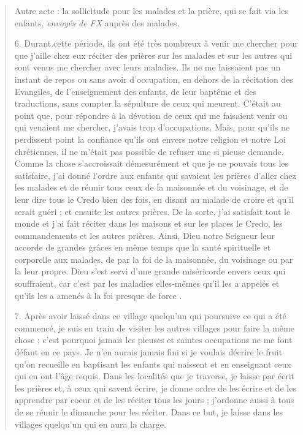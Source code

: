 \begin{quote}
\begin{Synthesis}
Autre acte : la sollicitude pour les malades et la prière, qui se fait via les enfants, \textit{envoyés de FX} auprès des malades. 
\end{Synthesis}
6. Durant.cette période, ils ont été très nombreux à venir me
chercher pour que j'aille chez eux réciter des prières sur les malades
et sur les autres qui sont venus me chercher avec leurs maladies.
Ils ne me laissaient pas un instant de repos ou sans avoir
d'occupation, en dehors de la récitation des Evangiles, de l'enseignement
des enfants, de leur baptême et des traductions, sans
compter la sépulture de ceux qui meurent. C'était au point que,
pour répondre à la dévotion de ceux qui me faisaient venir ou qui
venaient me chercher, j'avais trop d'occupations. Mais, pour qu'ils
ne perdissent point la confiance qu'ils ont envers notre religion et
notre Loi chrétiennes, il ne m'était pas possible de refuser une si
 pieuse demande. Comme la chose s'accroissait démesurément et
que je ne pouvais tous les satisfaire, j'ai donné l'ordre aux enfants
qui savaient les prières d'aller chez les malades et de réunir tous
ceux de la maisonnée et du voisinage, et de leur dire tous le Credo
bien des fois, en disant au malade de croire et qu'il serait guéri ;
et ensuite les autres prières. De la sorte, j'ai satisfait tout le monde
et j'ai fait réciter dans les maisons et sur les places le Credo, les
commandements et les autres prières. Ainsi, Dieu notre Seigneur
leur accorde de grandes grâces en même temps que la santé spirituelle
et corporelle aux malades, de par la foi de la maisonnée, du
voisinage ou par la leur propre. Dieu s'est servi d'une grande miséricorde
envers ceux qui souffraient, car c'est par les maladies elles-mêmes
qu'il les a appelés et qu'ils les a amenés à la foi presque de
force .


7. Après avoir laissé dans ce village quelqu'un qui poursuive ce
qui a été commencé, je suis en train de visiter les autres villages
pour faire la même chose ; c'est pourquoi jamais les pieuses et saintes
occupations ne me font défaut en ce pays. Je n'en aurais jamais
fini si je voulais décrire le fruit qu'on recueille en baptisant les
enfants qui naissent et en enseignant ceux qui en ont l'âge requis.
Dans les localités que je traverse, je laisse par écrit les prières et,
à ceux qui savent écrire, je donne ordre de les écrire et de les
apprendre par coeur et de les réciter tous les jours ; j'ordonne aussi
à tous de se réunir le dimanche pour les réciter. Dans ce but, je
laisse dans les villages quelqu'un qui en aura la charge.


\end{quote}
